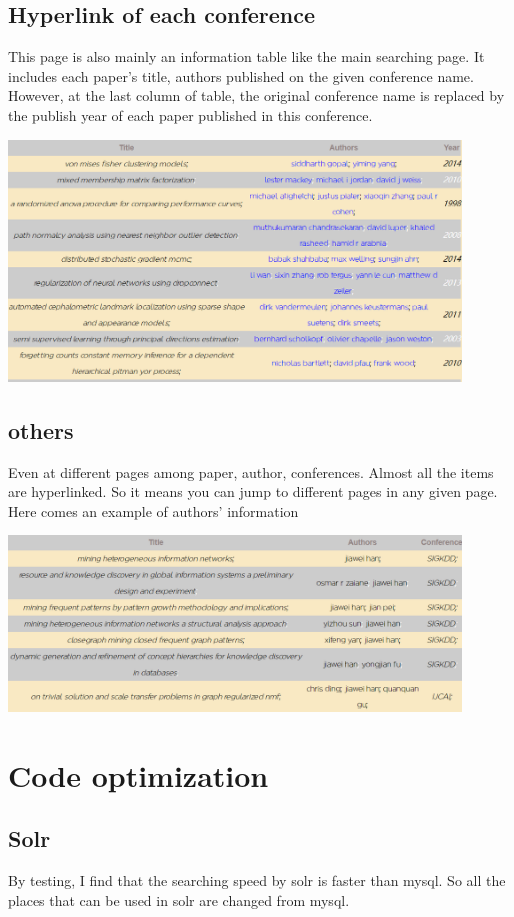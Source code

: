 \documentclass[10pt,twoside,a4paper,titlepage]{article}
\begin{document}
\subsection{Hyperlink of each conference}
This page is also mainly an information table like the main searching page. It includes each paper’s title, authors published on the given conference name. However, at the last column of table, the original conference name is replaced by the publish year of each paper published in this conference.\par
\includegraphics[width=0.9\textwidth]{jaf/conference.PNG}\newline\par
\subsection{others}
Even at different pages among paper, author, conferences. Almost all the items are hyperlinked. So it means you can jump to different pages in any given page. Here comes an example of authors' information\par
\includegraphics[width=0.9\textwidth]{jaf/author.PNG}\par

\section{Code optimization}
\subsection{Solr}
By testing, I find that the searching speed by solr is faster than mysql. So all the places that can be used in solr are changed from mysql.\par
\end{document}
